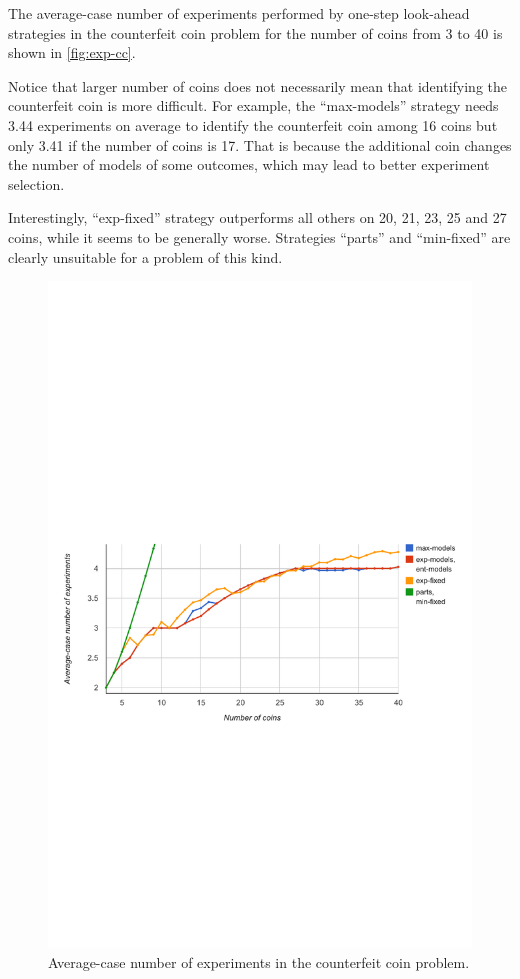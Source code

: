 The average-case number of experiments performed by one-step look-ahead
  strategies in the counterfeit coin problem
  for the number of coins from 3 to 40 is shown in \autoref{fig:exp-cc}.

Notice that larger number of coins does not necessarily mean that
  identifying the counterfeit coin is more difficult.
For example, the ``max-models'' strategy needs
  3.44 experiments on average to identify the counterfeit coin
  among 16 coins but only 3.41 if the number of coins is 17.
That is because the additional coin changes
  the number of models of some outcomes,
  which may lead to better experiment selection.

Interestingly, ``exp-fixed'' strategy outperforms all others
  on 20, 21, 23, 25 and 27 coins, while it seems to be
  generally worse.
Strategies ``parts'' and ``min-fixed'' are clearly unsuitable for
  a problem of this kind.

\begin{figure}[ht]
\begin{center}
\includegraphics[width=\textwidth]{pictures/graph-cc.pdf}
\caption{Average-case number of experiments in the counterfeit coin problem.}
\label{fig:exp-cc}
\end{center}
\end{figure}

